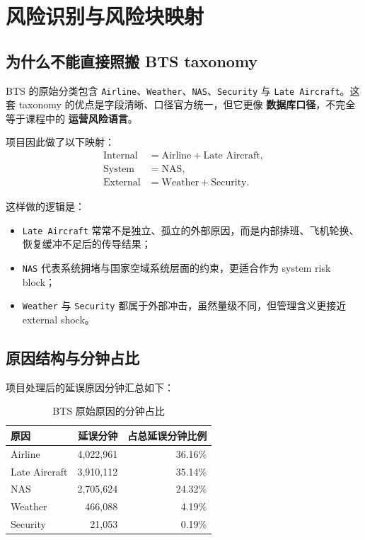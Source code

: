 \section{风险识别与风险块映射}

\subsection{为什么不能直接照搬 BTS taxonomy}

BTS 的原始分类包含 \texttt{Airline}、\texttt{Weather}、\texttt{NAS}、\texttt{Security} 与 \texttt{Late Aircraft}。这套 taxonomy 的优点是字段清晰、口径官方统一，但它更像 \textbf{数据库口径}，不完全等于课程中的 \textbf{运营风险语言}。

项目因此做了以下映射：
\begin{align}
\text{Internal} &= \text{Airline} + \text{Late Aircraft}, \\
\text{System} &= \text{NAS}, \\
\text{External} &= \text{Weather} + \text{Security}.
\end{align}

这样做的逻辑是：
\begin{itemize}[leftmargin=2.2em]
  \item \texttt{Late Aircraft} 常常不是独立、孤立的外部原因，而是内部排班、飞机轮换、恢复缓冲不足后的传导结果；
  \item \texttt{NAS} 代表系统拥堵与国家空域系统层面的约束，更适合作为 system risk block；
  \item \texttt{Weather} 与 \texttt{Security} 都属于外部冲击，虽然量级不同，但管理含义更接近 external shock。
\end{itemize}

\subsection{原因结构与分钟占比}

项目处理后的延误原因分钟汇总如下：
\begin{table}[H]
\centering
\caption{BTS 原始原因的分钟占比}
\begin{tabular}{lrr}
\toprule
原因 & 延误分钟 & 占总延误分钟比例 \\
\midrule
Airline & 4{,}022{,}961 & 36.16\% \\
Late Aircraft & 3{,}910{,}112 & 35.14\% \\
NAS & 2{,}705{,}624 & 24.32\% \\
Weather & 466{,}088 & 4.19\% \\
Security & 21{,}053 & 0.19\% \\
\bottomrule
\end{tabular}
\end{table}

